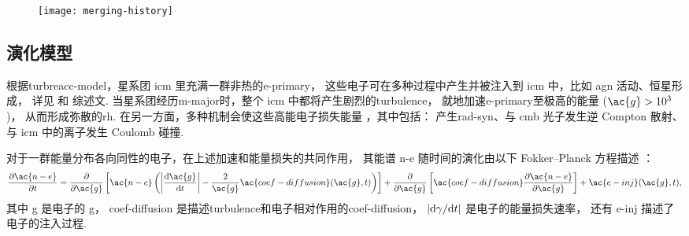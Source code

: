 \begin{figure}[htp]
  \centering
  \texttt{[image: merging-history]}
  \label{fig:merging-history}
\end{figure}

\subsection{演化模型}
\label{sec:halo-evo}

根据\ac{turbreacc-model}，星系团 \ac{icm} 里充满一群非热的\ac{e-primary}，
这些电子可在多种过程中产生并被注入到 \ac{icm} 中，比如 \ac{agn} 活动、恒星形成，
详见  和  综述文.
当星系团经历\ac{m-major}时，整个 \ac{icm} 中都将产生剧烈的\ac{turbulence}，
就地加速\ac{e-primary}至极高的能量 ($\ac{g} > \num{e3}$)，
从而形成弥散的\ac{rh}.
在另一方面，多种机制会使这些高能电子损失能量 \cite{sarazin1999}，其中包括：
产生\ac{rad-syn}、与 \ac{cmb} 光子发生逆 Compton 散射、
与 \ac{icm} 中的离子发生 Coulomb 碰撞.

对于一群能量分布各向同性的电子，在上述加速和能量损失的共同作用，
其能谱 \ac{n-e} 随时间的演化由以下 Fokker--Planck 方程描述
\cite{eilek1991,schlickeiser2002}：
\begin{equation}
  \label{eq:fokkerplanck}
  \pdiff{\ac{n-e}}{t} =
    \pdiff{}{\ac{g}} \left[ \ac{n-e} \left(
      \left| \diff{\ac{g}}{t} \right| -
      \frac{2}{\ac{g}} \ac{coef-diffusion}(\ac{g}, t) \right) \right]
    + \pdiff{}{\ac{g}} \left[
      \ac{coef-diffusion} \pdiff{\ac{n-e}}{\ac{g}} \right]
    + \ac{e-inj}(\ac{g}, t) ,
\end{equation}
其中
\ac{g} 是电子的 \acl{g}，
\ac{coef-diffusion} 是描述\ac{turbulence}和电子相对作用的\acl{coef-diffusion}，
$|\mathrm{d}\gamma / \mathrm{d}t|$ 是电子的能量损失速率，
还有 \ac{e-inj} 描述了电子的注入过程.

